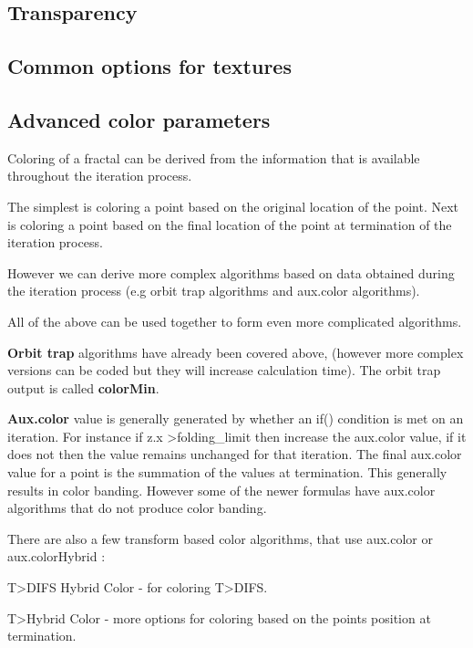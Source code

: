 \subsection{Transparency}\label{materials-transparency}

\subsection{Common options for textures}\label{materials-textures}

\subsection{Advanced color parameters}\label{materials-advanced-color-parameters}

Coloring of a fractal can be derived from the information that is available throughout the iteration process.

The simplest is coloring a point based on the original location of the point.
Next is coloring a point based on the final location of the point at termination of the iteration process.

However we can derive more complex algorithms based on data obtained during the iteration process (e.g orbit trap algorithms and aux.color algorithms).

All of the above can be used together to form even more complicated algorithms.

\textbf{Orbit trap} algorithms have already been covered above, (however more complex versions can be coded but they will increase calculation time). The orbit trap output is called \textbf{colorMin}.

\textbf{Aux.color} value is generally generated by whether an if() condition is met on an iteration. For instance if z.x \textgreater\space folding\_limit then increase the aux.color value, if it does not then the value remains unchanged for that iteration. The final aux.color value for a point is the summation of the values at termination. This generally results in color banding. However some of the newer formulas have aux.color algorithms that do not produce color banding.

There are also a few transform based color algorithms, that use aux.color or aux.colorHybrid :

T>DIFS Hybrid Color - for coloring T>DIFS.

T>Hybrid Color - more options for coloring based on the points position at termination.

